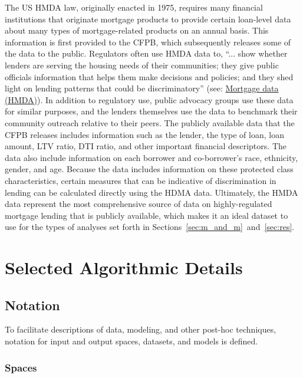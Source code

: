 \documentclass[information,article,accept,moreauthors,pdftex]{Definitions/mdpi}
\begin{document}
{The US HMDA law, originally enacted in 1975, requires many financial institutions that originate mortgage products to provide certain loan-level data about many types of mortgage-related products on an annual basis. This information is first provided to the CFPB, which subsequently releases some of the data to the public. Regulators often use HMDA data to, ``... show whether lenders are serving the housing needs of their communities; they give public officials information that helps them make decisions and policies; and they shed light on lending patterns that could be discriminatory'' (see: \href{https://www.consumerfinance.gov/data-research/hmda/}{Mortgage data (HMDA)}). In addition to regulatory use, public advocacy groups use these data for similar purposes, and the lenders themselves use the data to benchmark their community outreach relative to their peers.  The publicly available data that the CFPB releases includes information such as the lender, the type of loan, loan amount, LTV ratio, DTI ratio, and other important financial descriptors. The data also include information on each borrower and co-borrower’s race, ethnicity, gender, and age. Because the data includes information on these protected class characteristics, certain measures that can be indicative of discrimination in lending can be calculated directly using the HDMA data. Ultimately, the HMDA data represent the most comprehensive source of data on highly-regulated mortgage lending that is publicly available, which makes it an ideal dataset to use for the types of analyses set forth in Sections~\ref{sec:m_and_m}~and~\ref{sec:res}.  

\section{Selected Algorithmic Details}\label{a_sec:algo}
\vspace{-6pt}

\subsection{Notation}\label{a_ssec:not}

To facilitate descriptions of data, modeling, and other post-hoc techniques, notation for input and output spaces, datasets, and models is defined.

\subsubsection{Spaces} 

}
\end{document}
